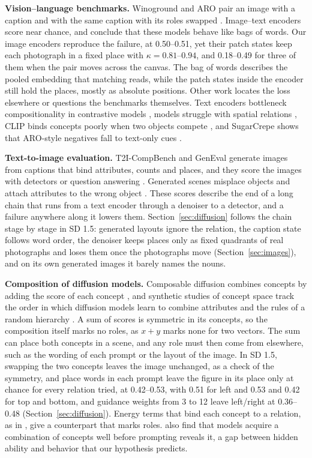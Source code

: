 \documentclass[10pt]{article}
\theoremstyle{plain}
\theoremstyle{remark}
\begin{document}
\textbf{Vision--language benchmarks.} Winoground and ARO pair an image with a caption and with the same caption with its roles swapped \citep{thrush2022winoground,yuksekgonul2023}. Image--text encoders score near chance, and \citet{yuksekgonul2023} conclude that these models behave like bags of words. Our image encoders reproduce the failure, at 0.50--0.51, yet their patch states keep each photograph in a fixed place with $\kappa = 0.81$--$0.94$, and 0.18--0.49 for three of them when the pair moves across the canvas. The bag of words describes the pooled embedding that matching reads, while the patch states inside the encoder still hold the places, mostly as absolute positions. Other work locates the loss elsewhere or questions the benchmarks themselves. Text encoders bottleneck compositionality in contrastive models \citep{kamath2023textenc}, models struggle with spatial relations \citep{kamath2023whatsup}, CLIP binds concepts poorly when two objects compete \citep{lewis2024clip}, and SugarCrepe shows that ARO-style negatives fall to text-only cues \citep{hsieh2023sugarcrepe}.

\textbf{Text-to-image evaluation.} T2I-CompBench and GenEval generate images from captions that bind attributes, counts and places, and they score the images with detectors or question answering \citep{huang2023t2i,ghosh2023geneval}. Generated scenes misplace objects and attach attributes to the wrong object \citep{conwell2022,rassin2022}. These scores describe the end of a long chain that runs from a text encoder through a denoiser to a detector, and a failure anywhere along it lowers them. Section~\ref{sec:diffusion} follows the chain stage by stage in SD 1.5: generated layouts ignore the relation, the caption state follows word order, the denoiser keeps places only as fixed quadrants of real photographs and loses them once the photographs move (Section~\ref{sec:images}), and on its own generated images it barely names the nouns.

\textbf{Composition of diffusion models.} Composable diffusion combines concepts by adding the score of each concept \citep{liu2022composable}, and synthetic studies of concept space track the order in which diffusion models learn to combine attributes \citep{okawa2023,park2024hidden} and the rules of a random hierarchy \citep{favero2025diffusion}. A sum of scores is symmetric in its concepts, so the composition itself marks no roles, as $x + y$ marks none for two vectors. The sum can place both concepts in a scene, and any role must then come from elsewhere, such as the wording of each prompt or the layout of the image. In SD 1.5, swapping the two concepts leaves the image unchanged, as a check of the symmetry, and place words in each prompt leave the figure in its place only at chance for every relation tried, at 0.42--0.53, with 0.51 for left and 0.53 and 0.42 for top and bottom, and guidance weights from 3 to 12 leave left/right at 0.36--0.48 (Section~\ref{sec:diffusion}). Energy terms that bind each concept to a relation, as in \citet{liu2021relations}, give a counterpart that marks roles. \citet{park2024hidden} also find that models acquire a combination of concepts well before prompting reveals it, a gap between hidden ability and behavior that our hypothesis predicts.
\end{document}
